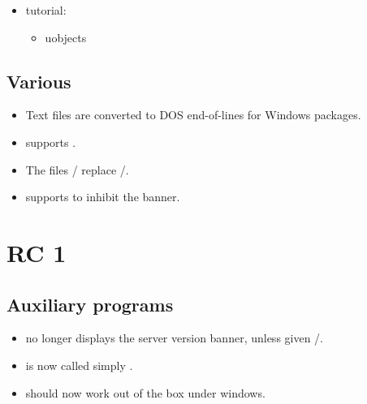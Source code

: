 \begin{itemize}
\begin{itemize}
  \item {}
  \item {}
  \item {}
  \item {}
  \item {}
  \item {}
  \end{itemize}
\item tutorial:
  \begin{itemize}
  \item uobjects
  \end{itemize}
\end{itemize}

\subsection{Various}

\begin{itemize}
\item Text files are converted to DOS end-of-lines for Windows packages.

\item {} supports .

\item The files / replace
  /.

\item {} supports  to inhibit the banner.
\end{itemize}

\section{ RC 1}

\subsection{Auxiliary programs}

\begin{itemize}
\item {} no longer displays the server version
  banner, unless given /.
\item {} is now called simply .
\item {} should now work out of the box under windows.
\end{itemize}


